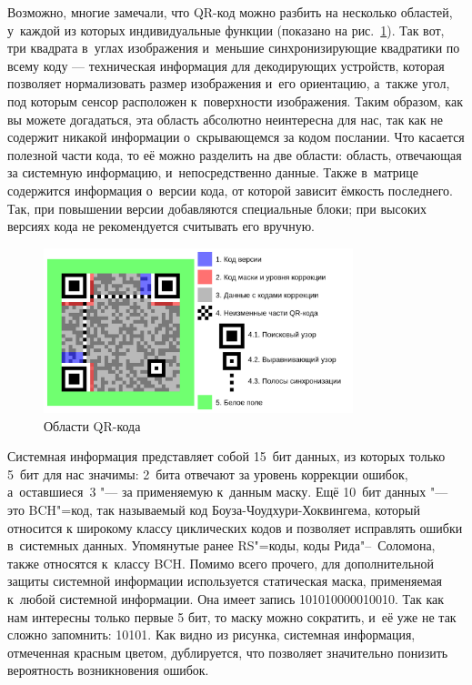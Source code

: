 \documentclass[final,pdftex]{../../template/epsilonj}
\begin{document}
Возможно, многие замечали, что QR-код можно разбить на несколько областей, у~каждой из которых индивидуальные функции (показано на рис.~\ref{fig:oblasti}). Так вот, три квадрата в~углах изображения и~меньшие синхронизирующие квадратики по всему коду --- техническая информация для декодирующих устройств, которая позволяет нормализовать размер изображения и~его ориентацию, а~также угол, под которым сенсор расположен к~поверхности изображения. Таким образом, как вы можете догадаться, эта область абсолютно неинтересна для нас, так как не содержит никакой информации о~скрывающемся за кодом послании. Что касается полезной части кода, то её можно разделить на две области: область, отвечающая за системную информацию, и~непосредственно данные. Также в~матрице содержится информация о~версии кода, от которой зависит ёмкость последнего. Так, при повышении версии добавляются специальные блоки; при высоких версиях кода не рекомендуется считывать его вручную.

\begin{figure}[hbt]
			\includegraphics[width=90mm]{qr1.png} 
			\caption{Области QR-кода}\label{fig:oblasti}
\end{figure}

Системная информация представляет собой 15~бит данных, из которых только 5~бит для нас значимы: 2~бита отвечают за уровень коррекции ошибок, а~оставшиеся~3 "--- за применяемую к~данным маску. Ещё 10~бит данных "--- это BCH"=код,  так называемый код Боуза-Чоудхури-Хоквингема, который относится к широкому классу циклических кодов и позволяет исправлять ошибки в~системных данных.  Упомянутые ранее RS"=коды, коды Рида"--~Соломона, также относятся к~классу BCH. Помимо всего прочего, для дополнительной защиты системной информации используется статическая маска, применяемая к~любой системной информации. Она имеет запись 101010000010010. Так как нам интересны только первые 5 бит, то маску можно сократить, и~её уже не так сложно запомнить: 10101. Как видно из рисунка, системная информация, отмеченная красным цветом, дублируется, что позволяет значительно понизить вероятность возникновения ошибок.
\end{document}
